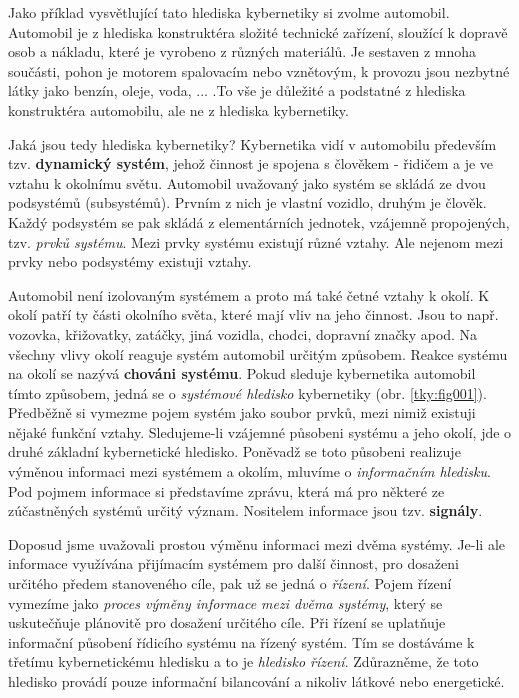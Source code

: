       Jako příklad vysvětlující tato hlediska kybernetiky si zvolme automobil. Automobil je z 
      hlediska konstruktéra složité technické zařízení, sloužící k dopravě osob a nákladu, které je 
      vyrobeno z různých materiálů. Je sestaven z mnoha součásti, pohon je motorem spalovacím nebo 
      vznětovým, k provozu jsou nezbytné látky jako benzín, oleje, voda, ... .To vše je důležité a 
      podstatné z hlediska konstruktéra automobilu, ale ne z hlediska kybernetiky.


      Jaká jsou tedy hlediska kybernetiky? Kybernetika vidí v automobilu především tzv. 
      \textbf{dynamický systém}, jehož činnost je spojena s člověkem - řidičem a je ve vztahu k 
      okolnímu světu. Automobil uvažovaný jako systém se skládá ze dvou podsystémů (subsystémů). 
      Prvním z nich je vlastní vozidlo, druhým je člověk. Každý podsystém se pak skládá z 
      elementárních jednotek, vzájemně propojených, tzv. \emph{prvků systému}. Mezi prvky systému 
      existují různé vztahy. Ale nejenom mezi prvky nebo podsystémy existuji vztahy.

      Automobil není izolovaným systémem a proto má také četné vztahy k okolí. K okolí  patří ty části okolního světa, které mají vliv na jeho činnost. Jsou to např. 
      vozovka, křižovatky, zatáčky, jiná vozidla, chodci, dopravní značky apod. Na všechny vlivy 
      okolí reaguje systém automobil určitým způsobem. Reakce systému na okolí se nazývá 
      \textbf{chováni systému}. Pokud sleduje kybernetika automobil tímto způsobem, jedná se o 
      \emph{systémové hledisko} kybernetiky  (obr. \ref{tky:fig001}). Předběžně si vymezme pojem 
      systém jako soubor prvků, mezi nimiž existuji nějaké funkční vztahy. Sledujeme-li vzájemné 
      působeni systému a jeho okolí, jde o druhé základní kybernetické hledisko. Poněvadž se toto 
      působeni realizuje výměnou informaci mezi systémem a okolím, mluvíme o \emph{informačním 
      hledisku}. Pod pojmem informace si představíme zprávu, která má pro některé ze zúčastněných 
      systémů určitý význam. Nositelem informace jsou tzv. \textbf{signály}.
      
      Doposud jsme uvažovali prostou výměnu informaci mezi dvěma systémy. Je-li ale informace 
      využívána přijímacím systémem pro další činnost, pro dosaženi určitého předem stanoveného 
      cíle, pak už se jedná o \emph{řízení}. Pojem řízení vymezíme jako \emph{proces výměny 
      informace mezi dvěma systémy}, který se uskutečňuje plánovitě pro dosažení určitého cíle. Při 
      řízení se uplatňuje informační působení řídicího systému na řízený systém. Tím se dostáváme k 
      třetímu kybernetickému hledisku a to je \emph{hledisko řízení}. Zdůrazněme, že toto hledisko 
      provádí pouze informační bilancování a nikoliv látkové nebo energetické.
      
